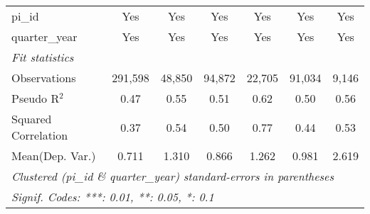 \begin{tabular}{lcccccc}
   pi\_id                                                     & Yes           & Yes          & Yes            & Yes           & Yes            & Yes\\  
   quarter\_year                                              & Yes           & Yes          & Yes            & Yes           & Yes            & Yes\\  
   \midrule
   \emph{Fit statistics}\\
   Observations                                               & 291,598       & 48,850       & 94,872         & 22,705        & 91,034         & 9,146\\  
   Pseudo R$^2$                                               & 0.47          & 0.55         & 0.51           & 0.62          & 0.50           & 0.56\\  
   Squared Correlation                                        & 0.37          & 0.54         & 0.50           & 0.77          & 0.44           & 0.53\\  
Mean(Dep. Var.) & 0.711 & 1.310 & 0.866 & 1.262 & 0.981 & 2.619 \\
   \midrule \midrule
   \multicolumn{7}{l}{\emph{Clustered (pi\_id \& quarter\_year) standard-errors in parentheses}}\\
   \multicolumn{7}{l}{\emph{Signif. Codes: ***: 0.01, **: 0.05, *: 0.1}}\\
\end{tabular}
\par\endgroup

